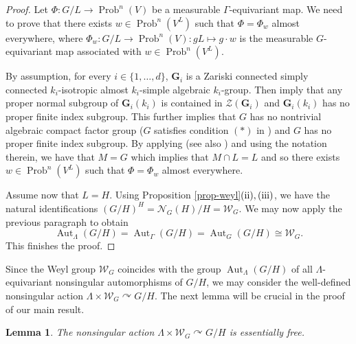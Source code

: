 \documentclass[11pt]{amsart}
\numberwithin{equation}{section}
\theoremstyle{plain}
\newtheorem{lem}[thm]{Lemma}
\theoremstyle{definition}
\newcommand{\Aut}{\operatorname{Aut}}
\newcommand{\Prob}{\operatorname{Prob}}
\begin{document}
\begin{proof}
Let $\Phi : G/L \to \Prob^n(V)$ be a measurable $\Gamma$-equivariant map. We need to prove that there exists $w \in \Prob^n(V^L)$ such that $\Phi = \Phi_w$ almost everywhere, where $\Phi_w : G/L \to \Prob^n(V) : gL \mapsto g \cdot w$ is the measurable $G$-equivariant map associated with $w \in \Prob^n(V^L)$. 

By assumption, for every $i \in \{1, \dots, d\}$, $\mathbf G_i$ is a Zariski connected simply connected $k_i$-isotropic almost $k_i$-simple algebraic $k_i$-group. Then \cite[Theorem I.1.5.6 and Corollary I.5.6.7]{Ma91} imply that any proper normal subgroup of $\mathbf G_i(k_i)$ is contained in $\mathscr Z(\mathbf G_i)$ and $\mathbf G_i(k_i)$ has no proper finite index subgroup. This further implies that $G$ has no nontrivial algebraic compact factor group ($G$ satisfies condition $(\ast)$ in \cite{BFGW12}) and $G$ has no proper finite index subgroup. By applying \cite[Theorem 1.6]{BFGW12} (see also \cite[Corollary 7.1]{BFGW12}) and using the notation therein, we have that $M = G$ which implies that $M \cap L = L$ and so there exists $w \in \Prob^n(V^L)$ such that $\Phi = \Phi_w$ almost everywhere.

Assume now that $L = H$. Using Proposition \ref{prop-weyl}$(\rm ii), (\rm iii)$, we have the natural identifications $(G/H)^H =  \mathscr N_{G}(H)/H = \mathscr W_G$. We may now apply the previous paragraph to obtain
$$\Aut_\Lambda(G/H) = \Aut_\Gamma(G/H) = \Aut_G(G/H) \cong \mathscr W_G.$$
This finishes the proof.
\end{proof}

Since the Weyl group $\mathscr W_G$ coincides with the group $\Aut_\Lambda(G/H)$ of all $\Lambda$-equivariant nonsingular automorphisms of $G/H$, we may consider the well-defined nonsingular action $\Lambda \times \mathscr W_G \curvearrowright G/H$. The next lemma will be crucial in the proof of our main result.



\begin{lem}\label{lem-free}
The nonsingular action $\Lambda \times \mathscr W_G \curvearrowright G/H$ is essentially free.
\end{lem}
\end{document}
